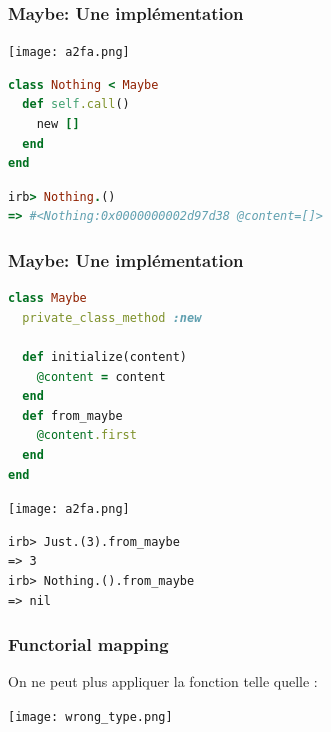 \documentclass{beamer}
\begin{document}
\begin{frame}[fragile]
\frametitle{Maybe: Une implémentation}
\begin{center}
\texttt{[image: a2fa.png]}
\end{center}

\begin{block}{}
\begin{lstlisting}[language=ruby,basicstyle=\ttfamily,keywordstyle=\color{red}]
class Nothing < Maybe
  def self.call()
    new []
  end
end
\end{lstlisting}
\end{block}
\begin{block}{}
\begin{lstlisting}[language=ruby,basicstyle=\ttfamily,keywordstyle=\color{red}]
irb> Nothing.()
=> #<Nothing:0x0000000002d97d38 @content=[]>
\end{lstlisting}
\end{block}
\end{frame}

\begin{frame}[fragile]
\frametitle{Maybe: Une implémentation}
\begin{block}{}
\begin{lstlisting}[language=ruby,basicstyle=\ttfamily,keywordstyle=\color{red}]
class Maybe
  private_class_method :new

  def initialize(content)
    @content = content
  end
  def from_maybe
    @content.first
  end
end
\end{lstlisting}
\end{block}
\end{frame}

\begin{frame}[fragile]

\begin{center}
\texttt{[image: a2fa.png]}
\end{center}

\begin{block}{}
\begin{lstlisting}[basicstyle=\ttfamily,keywordstyle=\color{red}]
irb> Just.(3).from_maybe
=> 3
irb> Nothing.().from_maybe
=> nil
\end{lstlisting}
\end{block}
\end{frame}


\begin{frame}
\frametitle{Functorial mapping}
On ne peut plus appliquer la fonction telle quelle :

\begin{center}
\texttt{[image: wrong\_type.png]}
\end{center}
\end{frame}
\end{document}
